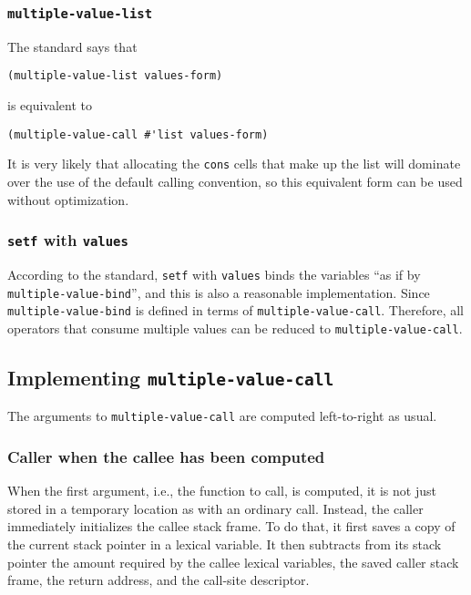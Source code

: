 \subsubsection{\texttt{multiple-value-list}}

The standard says that

\begin{verbatim}
(multiple-value-list values-form)
\end{verbatim}

is equivalent to

\begin{verbatim}
(multiple-value-call #'list values-form)
\end{verbatim}

It is very likely that allocating the \texttt{cons} cells that make up
the list will dominate over the use of the default calling convention,
so this equivalent form can be used without optimization. 

\subsubsection{\texttt{setf} with \texttt{values}}

According to the standard, \texttt{setf} with \texttt{values} binds
the variables ``as if by \texttt{multiple-value-bind}'', and this is
also a reasonable implementation.  Since \texttt{multiple-value-bind}
is defined in terms of \texttt{multiple-value-call}.  Therefore, all
operators that consume multiple values can be reduced to
\texttt{multiple-value-call}.

\subsection{Implementing \texttt{multiple-value-call}}
\label{sec-implementing-multiple-value-call}

The arguments to \texttt{multiple-value-call} are computed
left-to-right as usual.

\subsubsection{Caller when the callee has been computed}

When the first argument, i.e., the function to call, is computed, it
is not just stored in a temporary location as with an ordinary call.
Instead, the caller immediately initializes the callee stack frame.
To do that, it first saves a copy of the current stack pointer in a
lexical variable.  It then subtracts from its stack pointer the amount
required by the callee lexical variables, the saved caller stack
frame, the return address, and the call-site descriptor.

